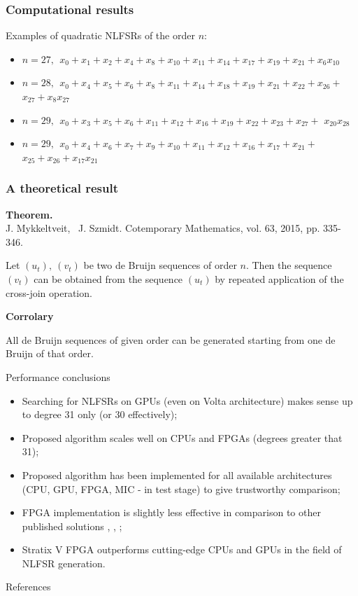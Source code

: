 \documentclass[10pt, compress]{beamer}
\begin{document}
\begin{frame}
\frametitle{Computational results}
Examples of quadratic NLFSRs of the order $n$:
\begin{itemize}
\item $n = 27, \ \ x_{0} + x_{1} + x_{2} + x_{4} + x_{8} + x_{10} + x_{11} + x_{14} + x_{17} + x_{19} + x_{21} + x_{6}x_{10} $
\item $ n = 28, \ \ x_{0} + x_{4} + x_{5} + x_{6} + x_{8} + x_{11} + x_{14} + x_{18} + x_{19} + x_{21} + x_{22} + x_{26} + $
$x_{27} + x_{8}x_{27} $
\item $n = 29, \ \ x_{0} + x_{3} + x_{5} + x_{6} + x_{11} + x_{12} + x_{16} + x_{19} + x_{22} + x_{23} + x_{27} + $
$x_{20}x_{28}  $
\item $ n = 29, \ \ x_{0} + x_{4} + x_{6} + x_{7} + x_{9} + x_{10} + x_{11} + x_{12} + x_{16} + x_{17} + x_{21} + $ $x_{25} + x_{26} + x_{17}x_{21}$
\end{itemize}
\end{frame}

\begin{frame}
\frametitle{A theoretical result}
\textbf{Theorem.} \\ 
J. Mykkeltveit, \ J. Szmidt. Cotemporary Mathematics, vol. 63, 2015, pp. 335-346. 

Let $ (u_{t}), \ (v_{t}) $ be two de Bruijn sequences of order $ n. $ Then the sequence $ (v_{t}) $ can be obtained from the sequence $ (u_{t}) $ by repeated application of the cross-join operation.

\textbf{Corrolary}

All de Bruijn sequences of given order can be generated starting from one de Bruijn of that order.

\end{frame}

\begin{frame}{Performance conclusions}

\begin{itemize}
    \item Searching for NLFSRs on GPUs (even on Volta architecture) makes sense up to degree 31 only (or 30 effectively);
    \item Proposed algorithm scales well on CPUs and FPGAs (degrees greater that 31);
    \item Proposed algorithm has been implemented for all available architectures (CPU, GPU, FPGA, MIC - in test stage) to give trustworthy comparison;
    \item FPGA implementation is slightly less effective in comparison to other published solutions \cite{Pol17}, \cite{Rachwalik_generationof}, \cite{DBLP:journals/ipl/DabrowskiLRS14};
    \item Stratix V FPGA outperforms cutting-edge CPUs and GPUs in the field of NLFSR generation.
\end{itemize}
\end{frame}

\begin{frame}{References}
  
  
\end{frame}

\end{document}
